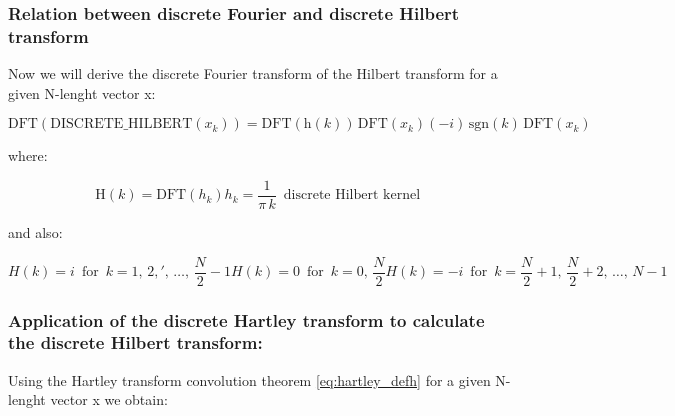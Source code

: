 \documentclass[12pt,twoside,a4paper]{article}
\numberwithin{equation}{subsection}
\numberwithin{figure}{subsection}
\begin{document}
\subsubsection*{Relation between discrete Fourier and discrete Hilbert transform}

Now we will derive the discrete Fourier transform of the Hilbert transform for a given N-lenght vector x:

\begin{equation} \label{eq:hartley_dfttheorem}
  \mathrm{DFT}(\mathrm{DISCRETE\_HILBERT}({x_{k}}))=\mathrm{DFT}(\mathrm{h}(k))\,\mathrm{DFT}({x_{k}}) (-
  i)\,\mathrm{sgn}(k)\,\mathrm{DFT}({x_{k}})
\end{equation}

where: 

\begin{subequations} \label{eq:hartley_dfttparams}
  \begin{equation}   \label{eq:hdfttps_bigh}
    \mathrm{H}(k) = \mathrm{DFT}({h_{k}})
  \end{equation}
  \begin{equation}   \label{eq:hdfttps_smallh}
    {h_{k}}=\frac {1}{\pi \,k}\,\mbox{ discrete Hilbert kernel }  
  \end{equation}
\end{subequations} 

and also: 

\begin{subequations} \label{eq:hartley_defh}
  \begin{equation}   \label{eq:hdefh_fhalf}
    H(k) = i \,\mbox{ for }\, k=1, \,2,',\,\ldots,\,\frac {N}{2} - 1
  \end{equation}
  \begin{equation}   \label{eq:hdefh_middle}
    H(k) = 0\,\mbox{ for }\,  k=0, \,\frac {N}{2}
  \end{equation}
  \begin{equation}   \label{eq:hdefh_shalf}
    H(k) = -i\, \mbox{ for } \,k=\frac {N}{2} + 1, \,\frac {N}{2} + 2,\,\ldots,\,N - 1
  \end{equation}
\end{subequations}

\subsubsection*{Application of the discrete Hartley transform to calculate the discrete Hilbert transform:}

Using the Hartley transform convolution theorem \ref{eq:hartley_defh} for a given N-lenght vector x we obtain:
\end{document}
